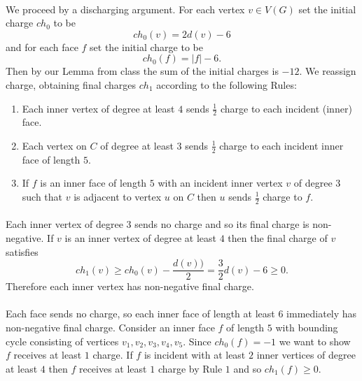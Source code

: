 \documentclass[letterpaper,12pt,oneside,onecolumn]{article}
\begin{document}
\paragraph{}
We proceed by a discharging argument. For each vertex $v \in V(G)$ set the initial charge $ch_0$ to be
$$ch_0(v) = 2d(v) -6$$
and for each face $f$ set the initial charge to be
$$ch_0(f) = |f| - 6.$$
Then by our Lemma from class the sum of the initial charges is $-12$. We reassign charge, obtaining final charges $ch_1$ according to the following Rules:
\begin{enumerate}
	\item Each inner vertex of degree at least $4$ sends $\frac{1}{2}$ charge to each incident (inner) face.
	\item Each vertex on $C$ of degree at least $3$ sends $\frac{1}{2}$ charge to each incident inner face of length $5$.
	\item If $f$ is an inner face of length $5$ with an incident inner vertex $v$ of degree $3$ such that $v$ is adjacent to vertex $u$ on $C$ then $u$ sends $\frac{1}{2}$ charge to $f$.
\end{enumerate}
\paragraph{}
Each inner vertex of degree $3$ sends no charge and so its final charge is non-negative. If $v$ is an inner vertex of degree at least $4$ then the final charge of $v$ satisfies
$$ch_1(v) \geq ch_0(v) - \frac{d(v))}{2} = \frac{3}{2}d(v) - 6 \geq 0.$$
Therefore each inner vertex has non-negative final charge.
\paragraph{}
Each face sends no charge, so each inner face of length at least $6$ immediately has non-negative final charge. Consider an inner face $f$ of length $5$ with bounding cycle consisting of vertices $v_1,v_2,v_3,v_4,v_5$. Since $ch_0(f) = -1$ we want to show $f$ receives at least $1$ charge. If $f$ is incident with at least $2$ inner vertices of degree at least $4$ then $f$ receives at least $1$ charge by Rule $1$ and so $ch_1(f) \geq 0$.
\end{document}
